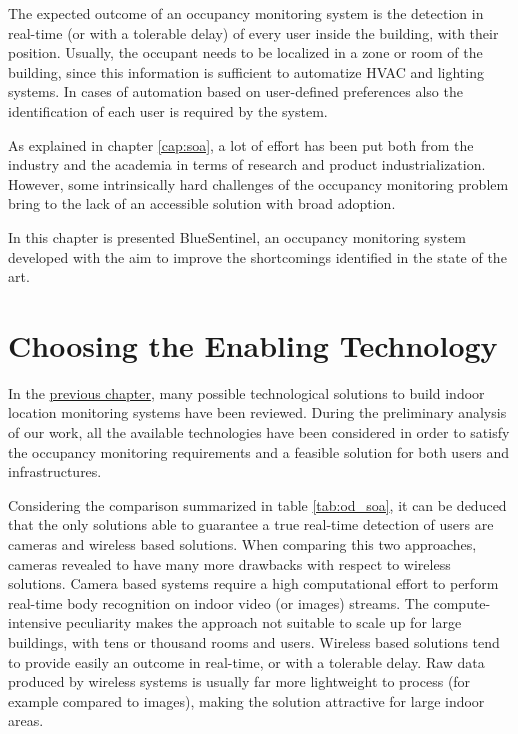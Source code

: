 \medskip
The expected outcome of an occupancy monitoring system is the detection in real-time (or with a tolerable delay) of every user inside the building, with their position. Usually, the occupant needs to be localized in a zone or room of the building, since this information is sufficient to automatize HVAC and lighting systems. In cases of automation based on user-defined preferences also the identification of each user is required by the system.

\smallskip
As explained in chapter \ref{cap:soa}, a lot of effort has been put both from the industry and the academia in terms of research and product industrialization. However, some intrinsically hard challenges of the occupancy monitoring problem bring to the lack of an accessible solution with broad adoption.

In this chapter is presented BlueSentinel, an occupancy monitoring system developed with the aim to improve the shortcomings identified in the state of the art.

\section{Choosing the Enabling Technology}
\label{sec:technology}
In the {\hyperref[cap:soa]{previous chapter}}, many possible technological solutions to build indoor location monitoring systems have been reviewed. During the preliminary analysis of our work, all the available technologies have been considered in order to satisfy the occupancy monitoring requirements and a feasible solution for both users and infrastructures.

Considering the comparison summarized in table \ref{tab:od_soa}, it can be deduced that the only solutions able to guarantee a true real-time detection of users are cameras and wireless based solutions. When comparing this two approaches, cameras revealed to have many more drawbacks with respect to wireless solutions.
Camera based systems require a high computational effort to perform real-time body recognition on indoor video (or images) streams. The compute-intensive peculiarity makes the approach not suitable to scale up for large buildings, with tens or thousand rooms and users.
Wireless based solutions tend to provide easily an outcome in real-time, or with a tolerable delay. Raw data produced by wireless systems is usually far more lightweight to process (for example compared to images), making the solution attractive for large indoor areas.


